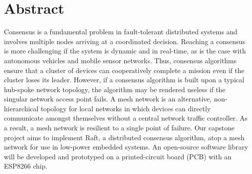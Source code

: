 \section{Abstract}
\newcommand{\nextInternalParagraphStartsHere}{}

Consensus is a fundamental problem in fault-tolerant distributed systems and involves multiple nodes arriving at a coordinated decision. Reaching a consensus is more challenging if the system is dynamic and in real-time, as is the case with autonomous vehicles and mobile sensor networks. Thus, consensus algorithms ensure that a cluster of devices can cooperatively complete a mission even if the cluster loses its leader. However, if a consensus algorithm is built upon a typical hub-spoke network topology, the algorithm may be rendered useless if the singular network access point fails. \nextInternalParagraphStartsHere A mesh network is an alternative, non-hierarchical topology for local networks in which devices can directly communicate amongst themselves without a central network traffic controller. As a result, a mesh network is resilient to a single point of failure. \nextInternalParagraphStartsHere Our capstone project aims to implement Raft, a distributed consensus algorithm, atop a mesh network for use in low-power embedded systems. An open-source software library will be developed and prototyped on a printed-circuit board (PCB) with an ESP8266 chip. 
